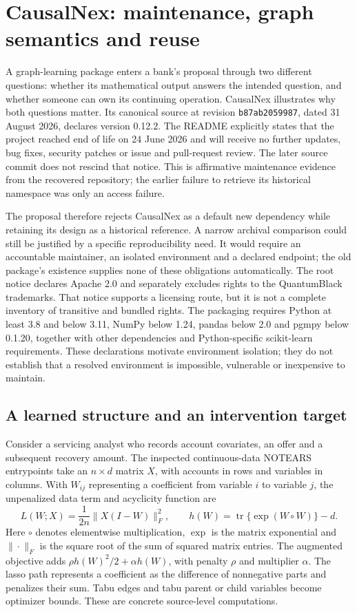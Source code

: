 \section{CausalNex: maintenance, graph semantics and reuse}
\label{exec14:causalnex}

A graph-learning package enters a bank's proposal through two different
questions: whether its mathematical output answers the intended question, and
whether someone can own its continuing operation. CausalNex illustrates why
both questions matter. Its canonical source at revision
\texttt{b87ab2059987}, dated 31 August 2026, declares version 0.12.2. The README
explicitly states that the project reached end of life on 24 June 2026 and
will receive no further updates, bug fixes, security patches or issue and
pull-request review. The later source commit does not rescind that notice.
This is affirmative maintenance evidence from the recovered repository; the
earlier failure to retrieve its historical namespace was only an access
failure.\citep{exec14_causalnex_primary}

The proposal therefore rejects CausalNex as a default new dependency while
retaining its design as a historical reference. A narrow archival comparison
could still be justified by a specific reproducibility need. It would require
an accountable maintainer, an isolated environment and a declared endpoint;
the old package's existence supplies none of these obligations automatically.
The root notice declares Apache 2.0 and separately excludes rights to the
QuantumBlack trademarks. That notice supports a licensing route, but it is
not a complete inventory of transitive and bundled rights. The packaging
requires Python at least 3.8 and below 3.11, NumPy below 1.24, pandas below 2.0
and pgmpy below 0.1.20, together with other dependencies and Python-specific
scikit-learn requirements. These declarations motivate environment isolation;
they do not establish that a resolved environment is impossible, vulnerable
or inexpensive to maintain.\citep{exec14_causalnex_primary}

\subsection{A learned structure and an intervention target}

Consider a servicing analyst who records account covariates, an offer and a
subsequent recovery amount. The inspected continuous-data NOTEARS entrypoints
take an $n\times d$ matrix $X$, with accounts in rows and variables in columns.
With $W_{ij}$ representing a coefficient from variable $i$ to variable $j$,
the unpenalized data term and acyclicity function are
\[
 L(W;X)=\frac{1}{2n}\|X(I-W)\|_F^2,
 \qquad h(W)=\operatorname{tr}\{\exp(W\circ W)\}-d.
\]
Here $\circ$ denotes elementwise multiplication, $\exp$ is the matrix
exponential and $\|\cdot\|_F$ is the square root of the sum of squared matrix
entries. The augmented objective adds $\rho h(W)^2/2+\alpha h(W)$, with
penalty $\rho$ and multiplier $\alpha$. The lasso path represents a coefficient
as the difference of nonnegative parts and penalizes their sum. Tabu edges and
tabu parent or child variables become optimizer bounds. These are concrete
source-level computations.\citep{exec14_causalnex_primary}

